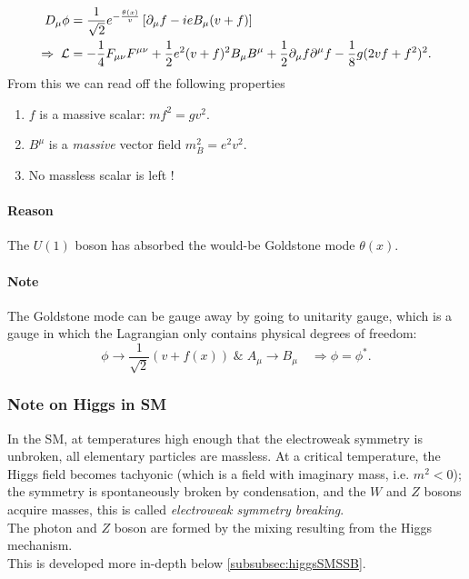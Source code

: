 \begin{align*}
	D_\mu \phi &= \frac{1}{\sqrt{2}} e^{-\frac{\theta(x)}{v}} \left[\partial_\mu f- ieB_\mu (v+f)\right]\\
	\Rightarrow \; \mathcal{L} &= - \frac{1}{4} F_{\mu \nu} F^{\mu \nu} + \frac{1}{2} e^2 (v+f)^2 B_\mu B^\mu + \frac{1}{2} \partial_\mu f \partial^\mu f - \frac{1}{8} g (2 v f+f^2)^2.
\end{align*}
From this we can read off the following properties
\begin{enumerate}
\item $f$ is a massive scalar: $mf^2 = gv^2$.
\item $B^\mu$ is a \emph{massive} vector field $m^2_B = e^2 v^2$.
\item No massless scalar is left !
\end{enumerate}
\paragraph{Reason}
The $U(1)$ boson has absorbed the would-be Goldstone mode $\theta(x)$.
\paragraph{Note}
The Goldstone mode can be gauge away by going to unitarity gauge, which is a gauge in which the Lagrangian only contains physical degrees of freedom:
\begin{equation}
\phi \rightarrow \frac{1}{\sqrt{2}} (v+f(x)) \; \& \; A_\mu \rightarrow B_\mu \quad \Rightarrow \phi=\phi^*.
\end{equation}
\subsubsection{Note on Higgs in SM}
In the SM, at temperatures high enough that the electroweak symmetry is unbroken, all elementary particles are massless. At a critical temperature, the Higgs field becomes tachyonic (which is a field with imaginary mass, i.e. $m^2<0$); the symmetry is spontaneously broken by condensation, and the $W$ and $Z$ bosons acquire masses, this is called \emph{electroweak symmetry breaking}.\\
The photon and $Z$ boson are formed by the mixing resulting from the Higgs mechanism.\\
This is developed more in-depth below \ref{subsubsec:higgsSMSSB}.

